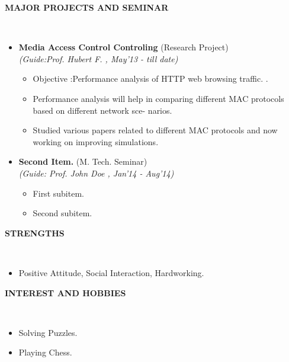 \documentclass[a4paper,10pt]{article}
\newcommand{\isep}{-2 pt}
\newcommand{\lsep}{-0.5cm}
\newcommand{\resheading}[1]{{\small \colorbox{mygrey}{\begin{minipage}{0.975\textwidth}{\textbf{#1 \vphantom{p\^{E}}}}\end{minipage}}}}
\begin{document}
\resheading{\textbf{MAJOR PROJECTS AND SEMINAR} }\\[\lsep]
\begin{itemize}
\item \textbf{Media Access Control Controling
} (Research Project) \\
 \emph{(Guide:Prof. Hubert F.
, May'13 - till date)} \\[-0.6cm]
	\begin{itemize}\itemsep \isep
	\item Objective :Performance analysis of HTTP web browsing traffic.
.
	\item Performance analysis will help in comparing different MAC protocols based on different network sce-
narios.

	\item Studied various papers related to different MAC protocols and now working on improving simulations.

	\end{itemize}

\item \textbf{Second Item.
} (M. Tech. Seminar) \\
 \emph{(Guide: Prof. John Doe
, Jan'14 - Aug'14)} \\[-0.6cm]
	\begin{itemize}\itemsep \isep
	\item First subitem.
	\item Second subitem.
	\end{itemize}
\end{itemize}

\resheading{\textbf{STRENGTHS} }\\[\lsep]
\begin{itemize}
\item \noindent Positive Attitude, Social Interaction, Hardworking.
\end{itemize}

\resheading{\textbf{INTEREST AND HOBBIES} }\\[\lsep]
\begin{itemize}
\item \noindent Solving Puzzles.
\item \noindent Playing Chess.

\end{itemize}
\end{document}
